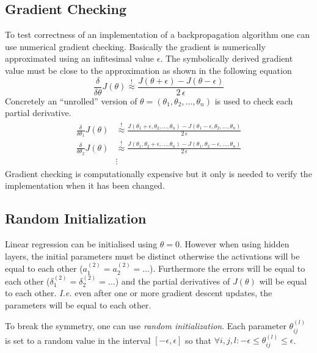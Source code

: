 \documentclass[a4paper,twoside,10pt]{article}
\begin{document}
\subsection{Gradient Checking}
To test correctness of an implementation of a backpropagation algorithm one can use numerical gradient checking.
Basically the gradient is numerically approximated using an infitesimal value $\epsilon$.
The symbolically derived gradient value must be close to the approximation as shown in the following equation
\begin{equation*}
\frac{\delta}{\delta\theta}J(\theta)\overset{!}{\approx}\frac{J(\theta+\epsilon)-J(\theta-\epsilon)}{2\,\epsilon}
\end{equation*}
Concretely an ``unrolled'' version of $\theta=(\theta_1,\theta_2,\ldots,\theta_n)$ is used to check each partial derivative.
\begin{align*}
  \begin{split}
    \frac{\delta}{\delta\theta_1}J(\theta)&\overset{!}{\approx}\frac{J(\theta_1+\epsilon,\theta_2,\ldots,\theta_n)-J(\theta_1-\epsilon,\theta_2,\ldots,\theta_n)}{2\,\epsilon}\\
    \frac{\delta}{\delta\theta_2}J(\theta)&\overset{!}{\approx}\frac{J(\theta_1,\theta_2+\epsilon,\ldots,\theta_n)-J(\theta_1,\theta_2-\epsilon,\ldots,\theta_n)}{2\,\epsilon}\\
                                          &\vdots
  \end{split}
\end{align*}
Gradient checking is computationally expensive but it only is needed to verify the implementation when it has been changed.

\subsection{Random Initialization}
Linear regression can be initialised using $\theta=0$.
However when using hidden layers, the initial parameters must be distinct otherwise the activations will be equal to each other ($a^{(2)}_1=a^{(2)}_2=\ldots$).
Furthermore the errors will be equal to each other ($\delta^{(2)}_1=\delta^{(2)}_2=\ldots$) and
the partial derivatives of $J(\theta)$ will be equal to each other.
\emph{I.e.} even after one or more gradient descent updates, the parameters will be equal to each other.

To break the symmetry, one can use \emph{random initialization}.
Each parameter $\theta^{(l)}_{ij}$ is set to a random value in the interval $[-\epsilon,\epsilon]$ so that $\forall i,j,l:-\epsilon\le\theta^{(l)}_{ij}\le\epsilon$.
\end{document}
